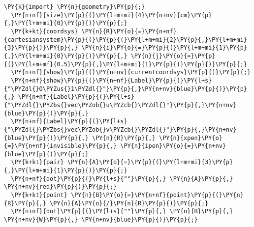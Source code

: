 \begin{Verbatim}[commandchars=\\\{\}]
  \PY{k}{import} \PY{n}{geometry}\PY{p}{;}
  \PY{n+nf}{size}\PY{p}{(}\PY{l+m+mi}{4}\PY{n+nv}{cm}\PY{p}{,}\PY{l+m+mi}{0}\PY{p}{)}\PY{p}{;}
  \PY{k+kt}{coordsys} \PY{n}{R}\PY{o}{=}\PY{n+nf}{cartesiansystem}\PY{p}{(}\PY{p}{(}\PY{l+m+mi}{2}\PY{p}{,}\PY{l+m+mi}{3}\PY{p}{)}\PY{p}{,} \PY{n}{i}\PY{o}{=}\PY{p}{(}\PY{l+m+mi}{1}\PY{p}{,}\PY{l+m+mi}{0}\PY{p}{)}\PY{p}{,} \PY{n}{j}\PY{o}{=}\PY{p}{(}\PY{l+m+mf}{0.5}\PY{p}{,}\PY{l+m+mi}{1}\PY{p}{)}\PY{p}{)}\PY{p}{;}
  \PY{n+nf}{show}\PY{p}{(}\PY{n+nv}{currentcoordsys}\PY{p}{)}\PY{p}{;}
  \PY{n+nf}{show}\PY{p}{(}\PY{n+nf}{Label}\PY{p}{(}\PY{l+s}{"\PYZdl{}O\PYZus{}1\PYZdl{}"}\PY{p}{,}\PY{n+nv}{blue}\PY{p}{)}\PY{p}{,} \PY{n+nf}{Label}\PY{p}{(}\PY{l+s}{"\PYZdl{}\PYZbs{}vec\PYZob{}u\PYZcb{}\PYZdl{}"}\PY{p}{,}\PY{n+nv}{blue}\PY{p}{)}\PY{p}{,}
  \PY{n+nf}{Label}\PY{p}{(}\PY{l+s}{"\PYZdl{}\PYZbs{}vec\PYZob{}v\PYZcb{}\PYZdl{}"}\PY{p}{,}\PY{n+nv}{blue}\PY{p}{)}\PY{p}{,} \PY{n}{R}\PY{p}{,} \PY{n}{xpen}\PY{o}{=}\PY{n+nf}{invisible}\PY{p}{,} \PY{n}{ipen}\PY{o}{=}\PY{n+nv}{blue}\PY{p}{)}\PY{p}{;}
  \PY{k+kt}{pair} \PY{n}{A}\PY{o}{=}\PY{p}{(}\PY{l+m+mi}{3}\PY{p}{,}\PY{l+m+mi}{1}\PY{p}{)}\PY{p}{;}
  \PY{n+nf}{dot}\PY{p}{(}\PY{l+s}{""}\PY{p}{,} \PY{n}{A}\PY{p}{,} \PY{n+nv}{red}\PY{p}{)}\PY{p}{;}
  \PY{k+kt}{point} \PY{n}{B}\PY{o}{=}\PY{n+nf}{point}\PY{p}{(}\PY{n}{R}\PY{p}{,} \PY{n}{A}\PY{o}{/}\PY{n}{R}\PY{p}{)}\PY{p}{;}
  \PY{n+nf}{dot}\PY{p}{(}\PY{l+s}{""}\PY{p}{,} \PY{n}{B}\PY{p}{,} \PY{n+nv}{W}\PY{p}{,} \PY{n+nv}{blue}\PY{p}{)}\PY{p}{;}
\end{Verbatim}
